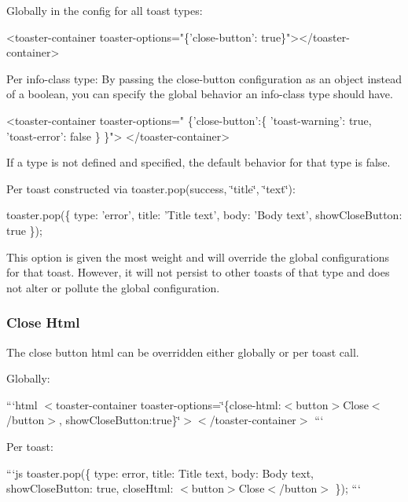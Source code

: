 \begin{DoxyItemize}
\item Globally in the config for all toast types\+: 
\begin{DoxyCode}
<toaster-container toaster-options="\{'close-button': true\}"></toaster-container>
\end{DoxyCode}

\item Per info-\/class type\+: By passing the close-\/button configuration as an object instead of a boolean, you can specify the global behavior an info-\/class type should have. 
\begin{DoxyCode}
<toaster-container toaster-options="
    \{'close-button':\{ 'toast-warning': true, 'toast-error': false \} \}">
</toaster-container>
\end{DoxyCode}
 If a type is not defined and specified, the default behavior for that type is false.
\item Per toast constructed via toaster.\+pop(\textquotesingle{}success\textquotesingle{}, \char`\"{}title\char`\"{}, \char`\"{}text\char`\"{})\+: 
\begin{DoxyCode}
toaster.pop(\{
                type: 'error',
                title: 'Title text',
                body: 'Body text',
                showCloseButton: true
            \});
\end{DoxyCode}
 This option is given the most weight and will override the global configurations for that toast. However, it will not persist to other toasts of that type and does not alter or pollute the global configuration.
\end{DoxyItemize}

\subsubsection*{Close Html}

The close button html can be overridden either globally or per toast call.


\begin{DoxyItemize}
\item Globally\+:

```html $<$toaster-\/container toaster-\/options=\char`\"{}\{\textquotesingle{}close-\/html\textquotesingle{}\+:\textquotesingle{}$<$button$>$\+Close$<$/button$>$\textquotesingle{}, 
        \textquotesingle{}show\+Close\+Button\textquotesingle{}\+:true\}\char`\"{}$>$$<$/toaster-\/container$>$ ```
\item Per toast\+:

```js toaster.\+pop(\{ type\+: \textquotesingle{}error\textquotesingle{}, title\+: \textquotesingle{}Title text\textquotesingle{}, body\+: \textquotesingle{}Body text\textquotesingle{}, show\+Close\+Button\+: true, close\+Html\+: \textquotesingle{}$<$button$>$Close$<$/button$>$\textquotesingle{} \}); ```
\end{DoxyItemize}

